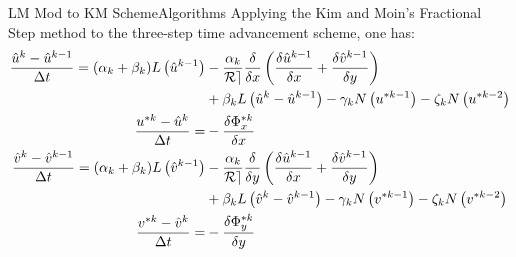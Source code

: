 \documentclass[\string~/GitHub/sthlmNordBeamerTheme/sthlmNordLightDemo.tex]{subfiles}
\begin{document}
\begin{frame}{LM Mod to KM Scheme}{Algorithms}
    Applying the Kim and Moin's Fractional Step method to the three-step time advancement scheme, one has: \begin{align*}
        \frac{\Hat{u}^k - \Hat{u}^{k-1}}{\Delta t} = (\alpha_k + \beta_k) L \left( \Hat{u}^{k-1} \right) &- \frac{\alpha_k}{\mathcal{Re}} \frac{\delta}{\delta x} \left( \frac{\delta \Hat{u}^{k-1}}{\delta x} + \frac{\delta \Hat{v}^{k-1}}{\delta y}  \right) \\
        &+ \beta_k L \left( \Hat{u}^k - \Hat{u}^{k-1} \right) - \gamma_k N \left( u^{* k-1} \right) - \zeta_k N \left( u^{* k-2} \right) \\
        \frac{u^{*k} - \Hat{u}^k}{\Delta t} = &- \frac{\delta \Phi^{*k}_x}{\delta x} \\
        \frac{\Hat{v}^k - \Hat{v}^{k-1}}{\Delta t} = (\alpha_k + \beta_k) L \left( \Hat{v}^{k-1} \right) &- \frac{\alpha_k}{\mathcal{Re}} \frac{\delta}{\delta y} \left( \frac{\delta \Hat{u}^{k-1}}{\delta x} + \frac{\delta \Hat{v}^{k-1}}{\delta y}  \right) \\
        &+ \beta_k L \left( \Hat{v}^k - \Hat{v}^{k-1} \right) - \gamma_k N \left( v^{* k-1} \right) - \zeta_k N \left( v^{* k-2} \right) \\
        \frac{v^{*k} - \Hat{v}^k}{\Delta t} = &- \frac{\delta \Phi^{*k}_y}{\delta y}
    \end{align*}
\end{frame}
\end{document}
